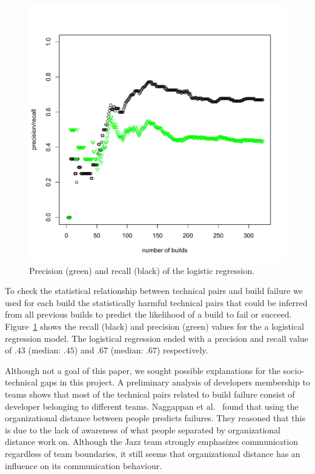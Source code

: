 \documentclass[conference]{IEEEtran}
\begin{document}
\begin{figure}[t]
\vspace{-29pt}
\centering
\includegraphics[width=\columnwidth]{precision-recall-logreg}
\vspace{-25pt}
\caption{Precision (green) and recall (black) of the logistic regression.}
\label{fig:prediction}
\end{figure}

To check the statistical relationship between technical pairs and build failure we used for each build the statistically harmful technical pairs that could be inferred from all previous builds to predict the likelihood of a build to fail or succeed.
Figure~\ref{fig:prediction} shows the recall (black) and precision (green) values for the
a logistical regression model. 
The logistical regression ended with a precision and recall value of $.43$ (median: $.45$) and $.67$ (median: $.67$) respectively.

Although not a goal of this paper, we sought possible explanations for the
socio-technical gaps in this project. A preliminary analysis of developers
membership to teams shows that most
of the technical pairs related to build failure consist of developer belonging to
different teams. Naggappan et al.~\cite{nagappan:icse:2008} found that using the
organizational distance between people predicts failures. They reasoned that this
is due to the lack of awareness of what people separated by organizational distance
work on. Although the Jazz team strongly emphasizes communication
regardless of team boundaries, it still seems that organizational distance has
an influence on its communication behaviour.
\end{document}
